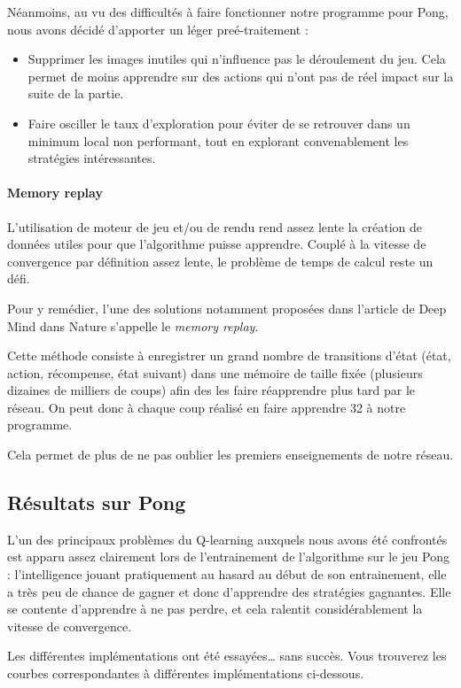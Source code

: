 \documentclass[
    10pt,
    a4paper,
    oneside,
    headinclude,footinclude,
    BCOR=5mm,
    captions=tableabove
]{scrartcl}
\begin{document}
Néanmoins, au vu des difficultés à faire fonctionner notre programme pour Pong, nous avons décidé d'apporter un léger preé-traitement :
\begin{itemize}
	\item Supprimer les images inutiles qui n'influence pas le déroulement du jeu. Cela permet de moins apprendre sur des actions qui n'ont pas de réel impact sur la suite de la partie.
	\item Faire osciller le taux d'exploration pour éviter de se retrouver dans un minimum local non performant, tout en explorant convenablement les stratégies intéressantes.
\end{itemize} 

\paragraph{Memory replay}
L'utilisation de moteur de jeu et/ou de rendu rend assez lente la création de données utiles pour que l'algorithme puisse apprendre. Couplé à la vitesse de convergence par définition assez lente, le problème de temps de calcul reste un défi.

Pour y remédier, l'une des solutions notamment proposées dans l'article de Deep Mind dans Nature s'appelle le \textit{memory replay}.

Cette méthode consiste à enregistrer un grand nombre de transitions d'état (état, action, récompense, état suivant) dans une mémoire de taille fixée (plusieurs dizaines de milliers de coups) afin des les faire réapprendre plus tard par le réseau.
On peut donc à chaque coup réalisé en faire apprendre 32 à notre programme.

Cela permet de plus de ne pas oublier les premiers enseignements de notre réseau.

\subsection{Résultats sur Pong}
L'un des principaux problèmes du Q-learning auxquels nous avons été confrontés est apparu assez clairement lors de l'entrainement de l'algorithme sur le jeu Pong : l'intelligence jouant pratiquement au hasard au début de son entrainement, elle a très peu de chance de gagner et donc d'apprendre des stratégies gagnantes.
Elle se contente d'apprendre à ne pas perdre, et cela ralentit considérablement la vitesse de convergence.

Les différentes implémentations ont été essayées… sans succès. Vous trouverez les courbes correspondantes à différentes implémentations ci-dessous.
\end{document}
